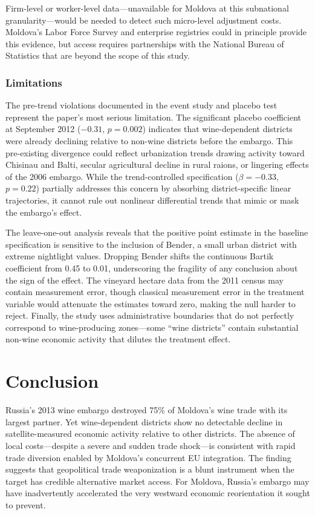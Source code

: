 \documentclass[12pt]{article}
\begin{document}
Firm-level or worker-level data---unavailable for Moldova at this subnational granularity---would be needed to detect such micro-level adjustment costs. Moldova's Labor Force Survey and enterprise registries could in principle provide this evidence, but access requires partnerships with the National Bureau of Statistics that are beyond the scope of this study.

\subsubsection*{Limitations} The pre-trend violations documented in the event study and placebo test represent the paper's most serious limitation. The significant placebo coefficient at September 2012 ($-0.31$, $p = 0.002$) indicates that wine-dependent districts were already declining relative to non-wine districts before the embargo. This pre-existing divergence could reflect urbanization trends drawing activity toward Chisinau and Balti, secular agricultural decline in rural raions, or lingering effects of the 2006 embargo. While the trend-controlled specification ($\beta = -0.33$, $p = 0.22$) partially addresses this concern by absorbing district-specific linear trajectories, it cannot rule out nonlinear differential trends that mimic or mask the embargo's effect.

The leave-one-out analysis reveals that the positive point estimate in the baseline specification is sensitive to the inclusion of Bender, a small urban district with extreme nightlight values. Dropping Bender shifts the continuous Bartik coefficient from 0.45 to 0.01, underscoring the fragility of any conclusion about the sign of the effect. The vineyard hectare data from the 2011 census may contain measurement error, though classical measurement error in the treatment variable would attenuate the estimates toward zero, making the null harder to reject. Finally, the study uses administrative boundaries that do not perfectly correspond to wine-producing zones---some ``wine districts'' contain substantial non-wine economic activity that dilutes the treatment effect.

\section{Conclusion}

Russia's 2013 wine embargo destroyed 75\% of Moldova's wine trade with its largest partner. Yet wine-dependent districts show no detectable decline in satellite-measured economic activity relative to other districts. The absence of local costs---despite a severe and sudden trade shock---is consistent with rapid trade diversion enabled by Moldova's concurrent EU integration. The finding suggests that geopolitical trade weaponization is a blunt instrument when the target has credible alternative market access. For Moldova, Russia's embargo may have inadvertently accelerated the very westward economic reorientation it sought to prevent.
\end{document}
